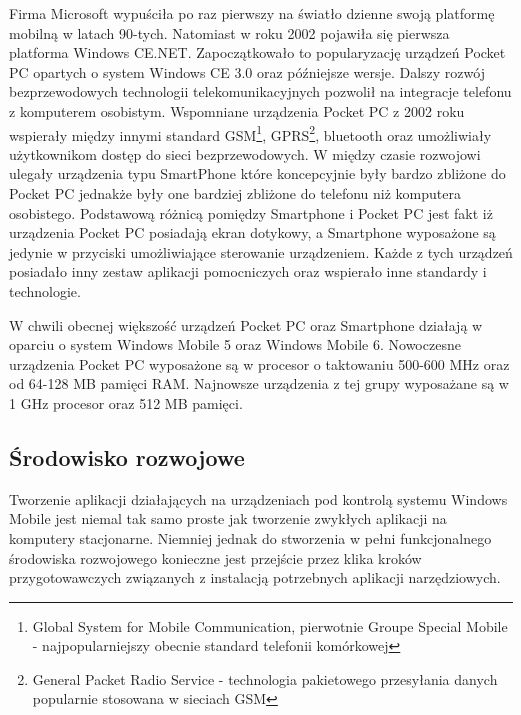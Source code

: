 Firma Microsoft wypuściła po raz pierwszy na światło dzienne swoją platformę
mobilną w latach 90-tych\cite{blog:wm-app-dev}. Natomiast w roku 2002 pojawiła
się pierwsza platforma Windows CE.NET. Zapoczątkowało to popularyzację urządzeń Pocket PC opartych o
system Windows CE 3.0 oraz późniejsze wersje. Dalszy rozwój bezprzewodowych
technologii telekomunikacyjnych pozwolił na integracje telefonu z komputerem
osobistym. Wspomniane urządzenia Pocket PC z 2002 roku wspierały między innymi
standard GSM\footnote{Global System for Mobile Communication, pierwotnie
Groupe Special Mobile - najpopularniejszy obecnie standard telefonii
komórkowej}, GPRS\footnote{General Packet Radio Service - technologia
pakietowego przesyłania danych popularnie stosowana w sieciach GSM}, bluetooth
oraz umożliwiały użytkownikom dostęp do sieci bezprzewodowych. W między czasie rozwojowi ulegały urządzenia typu SmartPhone które koncepcyjnie były bardzo zbliżone do Pocket PC jednakże były one bardziej zbliżone do telefonu niż komputera osobistego. Podstawową różnicą pomiędzy Smartphone i Pocket PC jest fakt iż urządzenia Pocket PC posiadają ekran dotykowy, a Smartphone wyposażone są jedynie w przyciski umożliwiające sterowanie
urządzeniem. Każde z tych urządzeń posiadało inny zestaw aplikacji pomocniczych
oraz wspierało inne standardy i technologie.

W chwili obecnej większość urządzeń Pocket PC oraz Smartphone działają w oparciu
o system Windows Mobile 5 oraz Windows Mobile 6. Nowoczesne urządzenia Pocket PC
wyposażone są w procesor o taktowaniu 500-600 MHz oraz od 64-128 MB pamięci RAM.
Najnowsze urządzenia z tej grupy wyposażane są w 1 GHz procesor oraz 512 MB
pamięci.

\subsection{Środowisko rozwojowe}
Tworzenie aplikacji działających na urządzeniach pod kontrolą systemu Windows
Mobile jest niemal tak samo proste jak tworzenie zwykłych aplikacji na komputery
stacjonarne. Niemniej jednak do stworzenia w pełni funkcjonalnego środowiska
rozwojowego konieczne jest przejście przez klika kroków przygotowawczych
związanych z instalacją potrzebnych aplikacji narzędziowych. 

